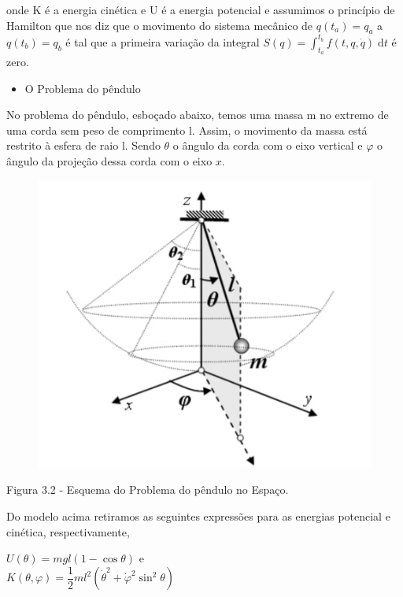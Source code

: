 \documentclass[12pt, a4paper]{article}
\begin{document}
onde K é a energia cinética e U é a energia potencial e assumimos o princípio de Hamilton que nos diz que o movimento do sistema mecânico de $q(t_a)= q_a$  a  $q(t_b )= q_b$ é tal que a primeira variação da integral $S(q)= \int_{t_a}^{t_b}f(t,q,\dot q)\; \mathrm{d}t$ é zero.


\begin{itemize}
\item O Problema do pêndulo
\end{itemize}

No problema do pêndulo, esboçado abaixo, temos uma massa m no extremo de uma corda sem peso de comprimento l. Assim, o movimento da massa está restrito à esfera de raio l. Sendo $\theta$ o ângulo da corda com o eixo vertical e $\varphi$ o ângulo da projeção dessa corda com o eixo $x$.

\begin{figure}[!h]
    \centering
    \includegraphics[scale=0.6]{imgs/pendulo.PNG}

  \end{figure}
  
\begin{center}
  Figura 3.2 - Esquema do Problema do pêndulo no Espaço.
  \end{center}  
  
Do modelo acima retiramos as seguintes expressões para as energias potencial e cinética, respectivamente,

\begin{center}
$U(\theta) = mgl(1-\cos\theta)$ e\\
$K(\theta, \varphi) = \dfrac{1}{2}ml^2({\dot \theta}^2 + {\dot \varphi}^2 \sin^2 \theta)$
\end{center}
  
\end{document}
